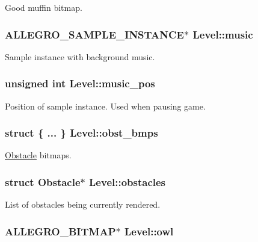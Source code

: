 Good muffin bitmap. \hypertarget{structLevel_a41c6aae8f508e078b02c291e1d6f8e67}{
\subsubsection[{music}]{\setlength{\rightskip}{0pt plus 5cm}A\-L\-L\-E\-G\-R\-O\-\_\-\-S\-A\-M\-P\-L\-E\-\_\-\-I\-N\-S\-T\-A\-N\-C\-E$\ast$ Level\-::music}}\label{structLevel_a41c6aae8f508e078b02c291e1d6f8e67}
Sample instance with background music. \hypertarget{structLevel_a13e322deb3298846260af31324e5b492}{
\subsubsection[{music\-\_\-pos}]{\setlength{\rightskip}{0pt plus 5cm}unsigned int Level\-::music\-\_\-pos}}\label{structLevel_a13e322deb3298846260af31324e5b492}
Position of sample instance. Used when pausing game. \hypertarget{structLevel_aeb52cb0b931eae0233dd1b50f2c02bf2}{
\subsubsection[{obst\-\_\-bmps}]{\setlength{\rightskip}{0pt plus 5cm}struct \{ ... \}   Level\-::obst\-\_\-bmps}}\label{structLevel_aeb52cb0b931eae0233dd1b50f2c02bf2}
\hyperlink{structObstacle}{Obstacle} bitmaps. \hypertarget{structLevel_a4b4ac826580c681b588dae8ae0dde418}{
\subsubsection[{obstacles}]{\setlength{\rightskip}{0pt plus 5cm}struct {\bf Obstacle}$\ast$ Level\-::obstacles}}\label{structLevel_a4b4ac826580c681b588dae8ae0dde418}
List of obstacles being currently rendered. \hypertarget{structLevel_af504e3f628040bc2a2913a50253e856d}{
\subsubsection[{owl}]{\setlength{\rightskip}{0pt plus 5cm}A\-L\-L\-E\-G\-R\-O\-\_\-\-B\-I\-T\-M\-A\-P$\ast$ Level\-::owl}}\label{structLevel_af504e3f628040bc2a2913a50253e856d}
